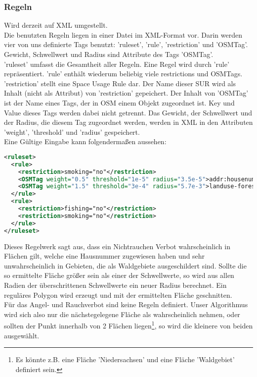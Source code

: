 \subsubsection{Regeln}
Wird derzeit auf XML umgestellt.\\
\label{sec:Eingabedaten_Wir}
Die benutzten Regeln liegen in einer Datei im XML-Format vor. Darin werden vier von uns definierte Tags benutzt: 'ruleset', 'rule',
'restriction' und 'OSMTag'. Gewicht, Schwellwert und Radius sind Attribute des Tags 'OSMTag'.\\
'ruleset' umfasst die Gesamtheit aller Regeln. Eine Regel wird durch 'rule' repräsentiert. 'rule' enthält wiederum beliebig viele
restrictions und OSMTags. 'restriction' stellt eine Space Usage Rule dar. Der Name dieser SUR wird als Inhalt (nicht als Attribut)
von 'restriction' gepeichert. Der Inhalt von 'OSMTag' ist der Name eines Tags, der in OSM einem Objekt zugeordnet ist. Key und Value
dieses Tags werden dabei nicht getrennt. Das Gewicht, der Schwellwert und der Radius, die diesem Tag zugeordnet werden, werden in XML
in den Attributen 'weight', 'threshold' und 'radius' gespeichert.\\
Eine Gültige Eingabe kann folgendermaßen aussehen:
\begin{lstlisting}[language=xml,frame=single]
<ruleset>
  <rule>
    <restriction>smoking="no"</restriction>
    <OSMTag weight="0.5" threshold="1e-5" radius="3.5e-5">addr:housenumber</OSMTag>
    <OSMTag weight="1.5" threshold="3e-4" radius="5.7e-3">landuse-forest</OSMTag>
  </rule>
  <rule>
    <restriction>fishing="no"</restriction>
    <restriction>smoking="no"</restriction>
  </rule>
</ruleset>
\end{lstlisting}
Dieses Regelwerk sagt aus, dass ein Nichtrauchen Verbot wahrscheinlich in Flächen gilt, welche eine Hausnummer zugewiesen haben
und sehr unwahrscheinlich in Gebieten, die als Waldgebiete ausgeschildert sind. Sollte die so ermittelte Fläche größer sein als
einer der Schwellwerte, so wird aus allen Radien der überschrittenen Schwellwerte ein neuer Radius berechnet. Ein reguläres Polygon
wird erzeugt und mit der ermittelten Fläche geschnitten.\\
Für das Angel- und Rauchverbot sind keine Regeln definiert. Unser Algorithmus wird sich also nur die nächstegelegene Fläche als wahrscheinlich nehmen,
oder sollten der Punkt innerhalb von 2 Flächen liegen\footnote{Es könnte z.B. eine Fläche 'Niedersachsen' und eine Fläche 'Waldgebiet' definiert sein.},
so wird die kleinere von beiden ausgewählt.


